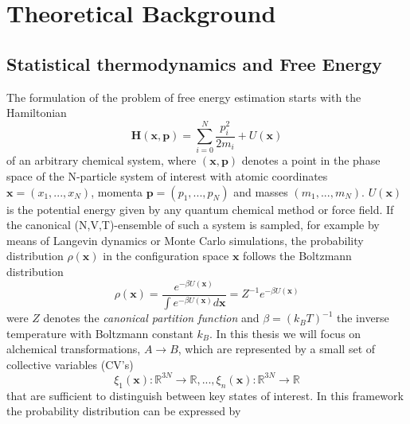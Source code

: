 \chapter{Theoretical Background}
\label{cha:theory}

\section{Statistical thermodynamics and Free Energy}
\label{sec:freeE}

The formulation of the problem of free energy estimation starts with the Hamiltonian
\begin{equation}
  \textbf{H}(\textbf{x},\textbf{p})=\sum_{i=0}^{N}\frac{p_{i}^{ 2}}{2 m_i} + U(\textbf{x})
  \label{eq:lagrangian}
\end{equation}
of an arbitrary chemical system, where $(\textbf{x},\textbf{p})$ denotes a point in the phase space of the N-particle system of interest with atomic coordinates $\textbf{x}=(x_1, ..., x_N)$, momenta $\textbf{p}=(p_1,...,p_N)$ and masses $(m_1,...,m_N)$. $U(\textbf{x})$ is the potential energy given by any quantum chemical method or force field. If the canonical (N,V,T)-ensemble of such a system is sampled, for example by means of Langevin dynamics or Monte Carlo simulations, the probability distribution $\rho(\textbf{x})$ in the configuration space $\textbf{x}$ follows the Boltzmann distribution
\begin{equation}
  \rho(\textbf{x})=\frac{e^{-\beta U(\textbf{x})}}{\int e^{-\beta U(\textbf{x})} d\textbf{x}}=Z^{-1}e^{-\beta U(\textbf{x})}
  \label{eq:boltzmann}
\end{equation}
were $Z$ denotes the \textit{canonical partition function} and $\beta=(k_B T)^{-1}$ the inverse temperature with Boltzmann constant $k_B$.\autocite{chipot2007free}
In this thesis we will focus on alchemical transformations, $A\longrightarrow B$, which are represented by a small set of collective variables (CV's)
\begin{equation}
 \xi_1(\textbf{x}) : \mathbb{R} ^{3N} \to \mathbb{R}, ..., \xi_n(\textbf{x}) : \mathbb{R} ^{3N} \to \mathbb{R}
\end{equation}
that are sufficient to distinguish between key states of interest.
In this framework the probability distribution can be expressed by
